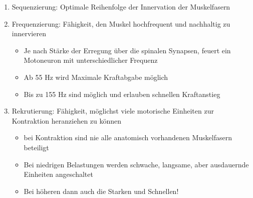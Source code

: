 \begin{minipage}{0.6\textwidth}
\begin{enumerate}
    \item Sequenzierung: Optimale Reihenfolge der Innervation der Muskelfasern
    \item Frequenzierung: Fähigkeit, den Muskel hochfrequent und nachhaltig zu innervieren
    \begin{itemize}
        \item Je nach Stärke der Erregung über die spinalen Synapsen, feuert ein Motoneuron mit unterschiedlicher Frequenz
        \item  Ab 55 Hz wird Maximale Kraftabgabe möglich
        \item  Bis zu 155 Hz sind möglich und erlauben schnellen Kraftanstieg
    \end{itemize}
    \item Rekrutierung: Fähigkeit, möglichst viele motorische Einheiten zur Kontraktion heranziehen zu können
    \begin{itemize}
        \item bei Kontraktion sind nie alle anatomisch vorhandenen Muskelfasern beteiligt
        \item Bei niedrigen Belastungen werden schwache, langsame, aber ausdauernde Einheiten angeschaltet
        \item Bei höheren dann auch die Starken und Schnellen!
    \end{itemize}
\end{enumerate}
\end{minipage}
